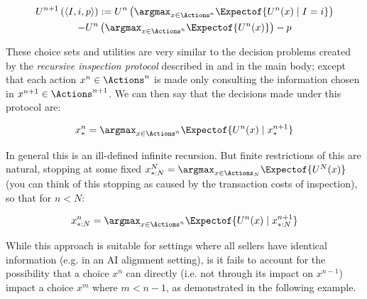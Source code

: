 \begin{multline}
U^{n+1}\left(\langle I, i, p\rangle\right) := U^n\left(\argmax_{x\in\Actions^n}\Expectof{U^n(x)\mid I=i}\right) \\
- U^n\left(\argmax_{x\in\Actions^n}\Expectof{U^n(x)}\right) - p
\label{infonomy:eq:voi-rim}
\end{multline}

These choice sets and utilities are very similar to the decision problems created by the \emph{recursive inspection protocol} described in  and in the main body; except that each action $x^n\in\Actions^n$ is made only consulting the information chosen in $x^{n+1}\in\Actions^{n+1}$. We can then say that the decisions made under this protocol are:

\begin{equation}
x^n_*=\argmax_{x\in\Actions^n} \Expectof{
  U^n(x)\mid x^{n+1}_*
}
\label{infonomy:eq:rim-choices}
\end{equation}

In general this is an ill-defined infinite recursion. But finite restrictions of this are natural, stopping at some fixed $x^N_{*:N}=\argmax_{x\in\Actions_N}\Expectof{U^N(x)}$ (you can think of this stopping as caused by the transaction costs of inspection), so that for $n<N$:

\begin{equation}
x^n_{*:N}=\argmax_{x\in\Actions^n} \Expectof{
  U^n(x)\mid x^{n+1}_{*:N}
}
\label{infonomy:eq:rim-choices-fin}
\end{equation}

While this approach is suitable for settings where all sellers have identical information (e.g. in an AI alignment setting), is it fails to account for the possibility that a choice $x^n$ can directly (i.e. not through its impact on $x^{n-1}$) impact a choice $x^m$ where $m<n-1$, as demonstrated in the following example.

